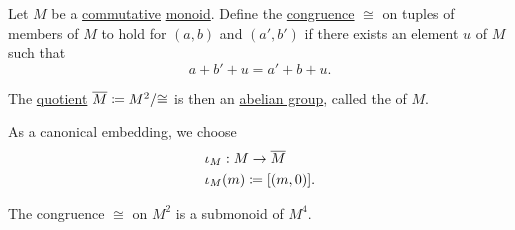 \begin{definition}\label{def:monoid_grothendieck_completion}
  Let \( M \) be a \hyperref[def:binary_operation/commutative]{commutative} \hyperref[def:monoid]{monoid}. Define the \hyperref[def:first_order_congruence]{congruence} \( \cong \) on tuples of members of \( M \) to hold for \( (a, b) \) and \( (a', b') \) if there exists an element \( u \) of \( M \) such that
  \begin{equation*}
    a + b' + u = a' + b + u.
  \end{equation*}

  The \hyperref[def:first_order_quotient]{quotient} \( \oline M \coloneqq M^2 / {\cong} \) is then an \hyperref[def:abelian_group]{abelian group}, called the  of \( M \).

  As a canonical embedding, we choose
  \begin{equation*}
    \begin{aligned}
      &\iota_M: M \to \oline M \\
      &\iota_M(m) \coloneqq [(m, 0)].
    \end{aligned}
  \end{equation*}
\end{definition}
\begin{comments}
  \item The congruence \( {\cong} \) on \( M^2 \) is a submonoid of \( M^4 \).
\end{comments}
